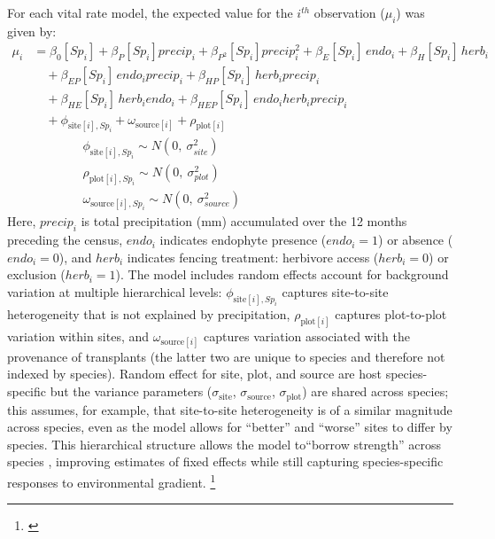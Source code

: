 \documentclass[12pt]{article}\usepackage[]{graphicx}\usepackage[dvipsnames]{xcolor}
\newcommand{\tom}[2]{{\color{red}{#1}}\footnote{\textit{\color{red}{#2}}}}
\begin{document}
For each vital rate model, the expected value for the $i^{th}$ observation ($\mu_{i}$) was given by:
\begin{equation}\label{eq:full_model}
\begin{aligned}
\mu_i &= \beta_0[Sp_i] + \beta_P[Sp_i] precip_i + \beta_{P^2}[Sp_i] precip_i^2 + \beta_{E}[Sp_i]\, endo_i + \beta_{H}[Sp_i]\, herb_i \\
&\quad + \beta_{EP}[Sp_i]\, endo_i precip_i 
       + \beta_{HP}[Sp_i]\, herb_i precip_i \\
&\quad + \beta_{HE}[Sp_i]\, herb_i endo_i + \beta_{HEP}[Sp_i]\, endo_i herb_i precip_i \\
&\quad  + \phi_{\text{site}[i],Sp_i} 
       + \omega_{\text{source}[i]} 
       + \rho_{\text{plot}[i]}
       \\
&\quad \quad \quad \quad \phi_{\text{site}[i],Sp_i} \sim N(0,\ \sigma^2_{site})\\
&\quad \quad \quad \quad \rho_{\text{plot}[i],Sp_i} \sim N(0,\ \sigma^2_{plot})\\
&\quad \quad \quad \quad \omega_{\text{source}[i],Sp_i} \sim N(0,\ \sigma^2_{source})
\end{aligned}
\end{equation}
\noindent Here, $precip_i$ is total precipitation (mm) accumulated over the 12 months preceding the census, $endo_i$ indicates endophyte presence ($endo_i=1$) or absence ($endo_i=0$), and $herb_i$ indicates fencing treatment: herbivore access ($herb_i=0$) or exclusion ($herb_i=1$).
The model includes random effects account for background variation at multiple hierarchical levels: $\phi_{\text{site}[i],Sp_i}$ captures site-to-site heterogeneity that is not explained by precipitation, $\rho_{\text{plot}[i]}$ captures plot-to-plot variation within sites, and $\omega_{\text{source}[i]}$ captures variation associated with the provenance of transplants (the latter two are unique to species and therefore not indexed by species).
Random effect for site, plot, and source are host species-specific but the variance parameters ($\sigma_{\text{site}}$, $\sigma_{\text{source}}$, $\sigma_{\text{plot}}$) are shared across species; this assumes, for example, that site-to-site heterogeneity is of a similar magnitude across species, even as the model allows for ``better'' and ``worse'' sites to differ by species. 
This hierarchical structure allows the model to``borrow strength'' across species \citep{gelman2007data}, improving estimates of fixed effects while still capturing species-specific responses to environmental gradient.
\tom{}{Notice my change to the random effects in the equation. I think this is the more correct way to show plot and source effects, since they are already unique to species, and this should not require any changes to the code.}
\end{document}
